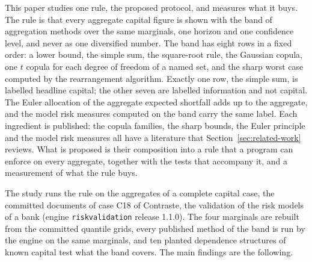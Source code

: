 This paper studies one rule, the proposed protocol, and measures what it buys. The rule is that every aggregate capital figure is
shown with the band of aggregation methods over the same marginals, one horizon and one confidence level, and never as one
diversified number. The band has eight rows in a fixed order: a lower bound, the simple sum, the square-root rule, the Gaussian
copula, one $t$ copula for each degree of freedom of a named set, and the sharp worst case computed by the rearrangement algorithm.
Exactly one row, the simple sum, is labelled headline capital; the other seven are labelled information and not capital. The Euler
allocation of the aggregate expected shortfall adds up to the aggregate, and the model risk measures computed on the band carry the
same label. Each ingredient is published: the copula families, the sharp bounds, the Euler principle and the model risk measures all
have a literature that Section~\ref{sec:related-work} reviews. What is proposed is their composition into a rule that a program can
enforce on every aggregate, together with the tests that accompany it, and a measurement of what the rule buys.

The study runs the rule on the aggregates of a complete capital case, the committed documents of case C18 of Contraste, the
validation of the risk models of a bank (engine \texttt{riskvalidation} release 1.1.0). The four marginals are rebuilt from the
committed quantile grids, every published method of the band is run by the engine on the same marginals, and ten planted
dependence structures of known capital test what the band covers. The main findings are the following.

